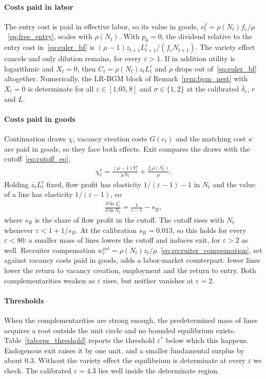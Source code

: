\documentclass[authoryear, review, 12pt]{elsarticle}
\begin{document}
\paragraph{Costs paid in labor} The entry cost is paid in effective labor, so its value in
goods, $\nu_t^f=\rho(N_t)f_e/\mu$~\eqref{eq:free_entry}, scales with $\rho(N_t)$. With
$p_0=0$, the dividend relative to the entry cost in~\eqref{eq:euler_bf} is
$(\mu-1)z_{t+1}L_{t+1}^c/(f_eN_{t+1})$. The variety effect cancels and only dilution remains,
for every $\varepsilon>1$. If in addition utility is logarithmic and $X_t=0$, then
$C_t=\rho(N_t)z_tL_t^c$ and $\rho$ drops out of~\eqref{eq:euler_bf} altogether. Numerically, the
LR-BGM block of Remark~\ref{rem:bgm_nest} with $X_t=0$ is determinate for all
$\varepsilon\in[1.05,8]$ and $\sigma\in\{1,2\}$ at the calibrated $\bar\delta_e$, $r$ and $L$.

\paragraph{Costs paid in goods} Continuation draws $\chi$, vacancy creation costs $G(e_t)$
and the matching cost $\kappa$ are paid in goods, so they face both effects. Exit compares
the draws with the cutoff~\eqref{eq:cutoff_eq},
\begin{align*}
	\chi_t^c=\frac{(\mu-1)Y_t^c}{\mu N_t}+\frac{f_e\rho(N_t)}{\mu}.
\end{align*}
Holding $z_tL_t^c$ fixed, flow profit has elasticity $1/(\varepsilon-1)-1$ in $N_t$ and the
value of a line has elasticity $1/(\varepsilon-1)$, so
\begin{align*}
	\frac{\partial\ln\chi_t^c}{\partial\ln N_t}=\frac{1}{\varepsilon-1}-s_R,
\end{align*}
where $s_R$ is the share of flow profit in the cutoff. The cutoff rises with $N_t$ whenever
$\varepsilon<1+1/s_R$. At the calibration $s_R=0.013$, so this holds for every
$\varepsilon<80$: a smaller mass of lines lowers the cutoff and induces exit, for
$\varepsilon>2$ as well. Recruiter compensation
$w_t^{int}=\rho(N_t)z_t/\mu$~\eqref{eq:recruiter_compensation}, set against vacancy costs
paid in goods, adds a labor-market counterpart: fewer lines lower the return to vacancy
creation, employment and the return to entry. Both complementarities weaken as
$\varepsilon$ rises, but neither vanishes at $\varepsilon=2$.

\paragraph{Thresholds} When the complementarities are strong enough, the predetermined mass
of lines acquires a root outside the unit circle and no bounded equilibrium exists.
Table~\ref{tab:eps_threshold} reports the threshold $\varepsilon^*$ below which this happens.
Endogenous exit raises it by one unit, and a smaller fundamental surplus by about 0.3.
Without the variety effect the equilibrium is determinate at every $\varepsilon$ we check.
The calibrated $\varepsilon=4.3$ lies well inside the determinate region.
\end{document}
